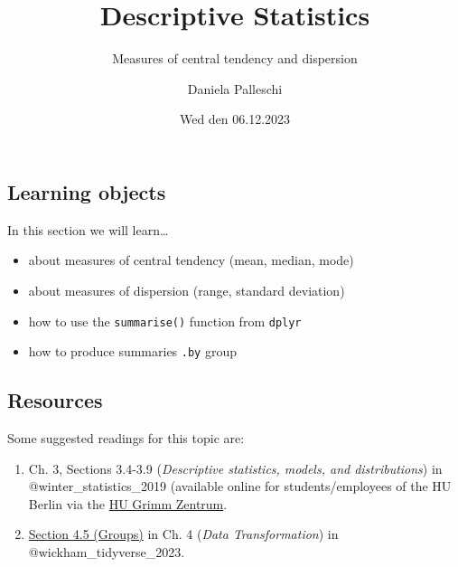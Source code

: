 \documentclass[
  letterpaper,
  DIV=11,
  numbers=noendperiod]{scrartcl}
\title{Descriptive Statistics}
\subtitle{Measures of central tendency and dispersion}
\author{Daniela Palleschi}
\date{Wed den 06.12.2023}
\providecommand{\tightlist}{%
  \setlength{\itemsep}{0pt}\setlength{\parskip}{0pt}}\usepackage{longtable,booktabs,array}
\begin{document}
\maketitle
\ifdefined\Shaded\renewenvironment{Shaded}{\begin{tcolorbox}[breakable, borderline west={3pt}{0pt}{shadecolor}, frame hidden, enhanced, sharp corners, boxrule=0pt, interior hidden]}{\end{tcolorbox}}\fi

\hypertarget{learning-objects}{%
\subsection*{Learning objects}\label{learning-objects}}

In this section we will learn\ldots{}

\begin{itemize}
\tightlist
\item
  about measures of central tendency (mean, median, mode)
\item
  about measures of dispersion (range, standard deviation)
\item
  how to use the \texttt{summarise()} function from \texttt{dplyr}
\item
  how to produce summaries \texttt{.by} group
\end{itemize}

\hypertarget{resources}{%
\subsection*{Resources}\label{resources}}

Some suggested readings for this topic are:

\begin{enumerate}
\def\labelenumi{\arabic{enumi}.}
\item
  Ch. 3, Sections 3.4-3.9 (\emph{Descriptive statistics, models, and
  distributions}) in @winter\_statistics\_2019 (available online for
  students/employees of the HU Berlin via the
  \href{https://hu-berlin.hosted.exlibrisgroup.com/permalink/f/uig076/TN_cdi_askewsholts_vlebooks_9781351677431}{HU
  Grimm Zentrum}.
\item
  \href{https://r4ds.hadley.nz/data-transform\#groups}{Section 4.5
  (Groups)} in Ch. 4 (\emph{Data Transformation}) in
  @wickham\_tidyverse\_2023.
\end{enumerate}
\end{document}
